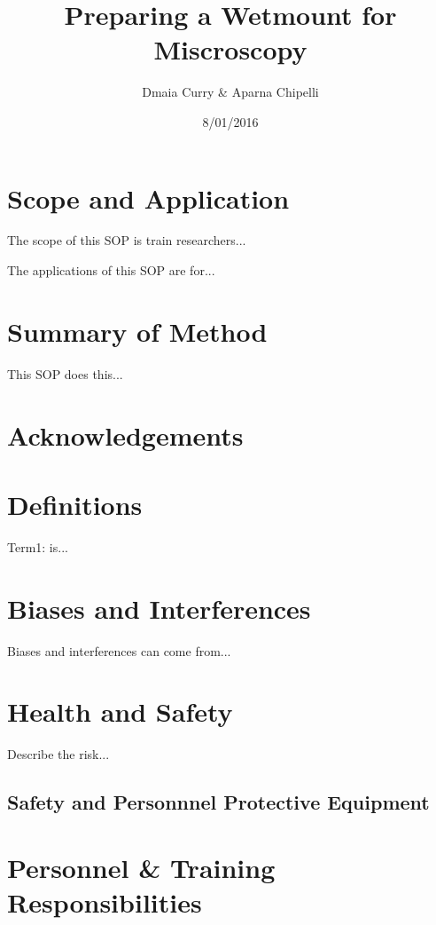\documentclass[12pt]{../SOP3_beta}
\title{Preparing a Wetmount for Miscroscopy}
\date{8/01/2016}
\author{Dmaia Curry \& Aparna Chipelli}
\begin{document}


\maketitle

\section{Scope and Application}

\NP The scope of this SOP is train researchers...

\NP The applications of this SOP are for...

\section{Summary of Method}

\NP This SOP does this...

\tableofcontents

\newpage

\section{Acknowledgements}

\section{Definitions}

\NP Term1: is...

\section{Biases and Interferences}

\NP Biases and interferences can come from...

\section{Health and Safety}

\NP Describe the risk...


\subsection{Safety and Personnnel Protective Equipment}


\section{Personnel \& Training Responsibilities}
\end{document}
